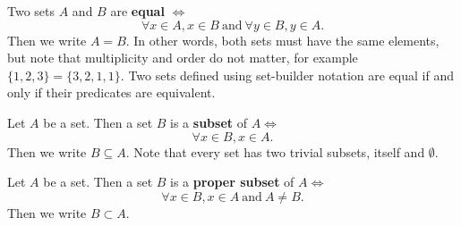 \documentclass[../real_analysis.tex]{subfiles}
\begin{document}
        \begin{definition}
            Two sets $A$ and $B$ are \textbf{equal} $\iff$
            \[\forall x \in A, x \in B\ \text{and}\ \forall y \in B, y \in A.\]
            Then we write $A = B$. In other words, both sets must have the same elements, but note that multiplicity and order do not matter, for example $\{1, 2, 3\} = \{3, 2, 1, 1\}$. Two sets defined using set-builder notation are equal if and only if their predicates are equivalent.
        \end{definition}
        \begin{definition}
            Let $A$ be a set. Then a set $B$ is a \textbf{subset} of $A \iff$
            \[\forall x \in B, x \in A.\]
            Then we write $B \subseteq A$. Note that every set has two trivial subsets, itself and $\emptyset$.
        \end{definition}
        \begin{definition}
            Let $A$ be a set. Then a set $B$ is a \textbf{proper subset} of $A \iff$
            \[\forall x \in B, x \in A\ \text{and}\ A \neq B.\]
            Then we write $B \subset A$.
        \end{definition}
\end{document}
